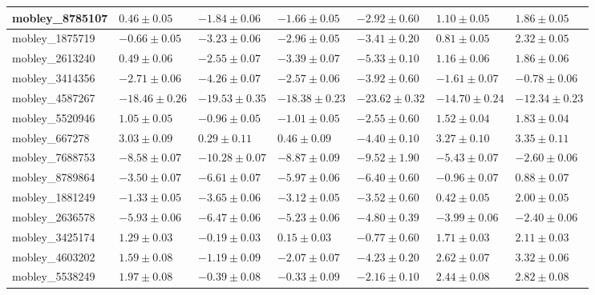 \documentclass{article}
\begin{document}
\begin{landscape}
\begin{longtable}{|l{3.0cm}|l{3.0cm}|l{3.2cm}|l{3.6cm}|l{3.0cm}|l{3.0cm}|l{3.0cm}|}
mobley\_8785107	&	$	0.46	\pm	0.05	$	&	$	-1.84	\pm	0.06	$	&	$	-1.66	\pm	0.05	$	&	$	-2.92	\pm	0.60	$	&	$	1.10	\pm	0.05	$	&	$	1.86	\pm	0.05	$	\\ \hline
mobley\_1875719	&	$	-0.66	\pm	0.05	$	&	$	-3.23	\pm	0.06	$	&	$	-2.96	\pm	0.05	$	&	$	-3.41	\pm	0.20	$	&	$	0.81	\pm	0.05	$	&	$	2.32	\pm	0.05	$	\\ \hline
mobley\_2613240	&	$	0.49	\pm	0.06	$	&	$	-2.55	\pm	0.07	$	&	$	-3.39	\pm	0.07	$	&	$	-5.33	\pm	0.10	$	&	$	1.16	\pm	0.06	$	&	$	1.86	\pm	0.06	$	\\ \hline
mobley\_3414356	&	$	-2.71	\pm	0.06	$	&	$	-4.26	\pm	0.07	$	&	$	-2.57	\pm	0.06	$	&	$	-3.92	\pm	0.60	$	&	$	-1.61	\pm	0.07	$	&	$	-0.78	\pm	0.06	$	\\ \hline
mobley\_4587267	&	$	-18.46	\pm	0.26	$	&	$	-19.53	\pm	0.35	$	&	$	-18.38	\pm	0.23	$	&	$	-23.62	\pm	0.32	$	&	$	-14.70	\pm	0.24	$	&	$	-12.34	\pm	0.23	$	\\ \hline
mobley\_5520946	&	$	1.05	\pm	0.05	$	&	$	-0.96	\pm	0.05	$	&	$	-1.01	\pm	0.05	$	&	$	-2.55	\pm	0.60	$	&	$	1.52	\pm	0.04	$	&	$	1.83	\pm	0.04	$	\\ \hline
mobley\_667278	&	$	3.03	\pm	0.09	$	&	$	0.29	\pm	0.11	$	&	$	0.46	\pm	0.09	$	&	$	-4.40	\pm	0.10	$	&	$	3.27	\pm	0.10	$	&	$	3.35	\pm	0.11	$	\\ \hline
mobley\_7688753	&	$	-8.58	\pm	0.07	$	&	$	-10.28	\pm	0.07	$	&	$	-8.87	\pm	0.09	$	&	$	-9.52	\pm	1.90	$	&	$	-5.43	\pm	0.07	$	&	$	-2.60	\pm	0.06	$	\\ \hline
mobley\_8789864	&	$	-3.50	\pm	0.07	$	&	$	-6.61	\pm	0.07	$	&	$	-5.97	\pm	0.06	$	&	$	-6.40	\pm	0.60	$	&	$	-0.96	\pm	0.07	$	&	$	0.88	\pm	0.07	$	\\ \hline
mobley\_1881249	&	$	-1.33	\pm	0.05	$	&	$	-3.65	\pm	0.06	$	&	$	-3.12	\pm	0.05	$	&	$	-3.52	\pm	0.60	$	&	$	0.42	\pm	0.05	$	&	$	2.00	\pm	0.05	$	\\ \hline
mobley\_2636578	&	$	-5.93	\pm	0.06	$	&	$	-6.47	\pm	0.06	$	&	$	-5.23	\pm	0.06	$	&	$	-4.80	\pm	0.39	$	&	$	-3.99	\pm	0.06	$	&	$	-2.40	\pm	0.06	$	\\ \hline
mobley\_3425174	&	$	1.29	\pm	0.03	$	&	$	-0.19	\pm	0.03	$	&	$	0.15	\pm	0.03	$	&	$	-0.77	\pm	0.60	$	&	$	1.71	\pm	0.03	$	&	$	2.11	\pm	0.03	$	\\ \hline
mobley\_4603202	&	$	1.59	\pm	0.08	$	&	$	-1.19	\pm	0.09	$	&	$	-2.07	\pm	0.07	$	&	$	-4.23	\pm	0.20	$	&	$	2.62	\pm	0.07	$	&	$	3.32	\pm	0.06	$	\\ \hline
mobley\_5538249	&	$	1.97	\pm	0.08	$	&	$	-0.39	\pm	0.08	$	&	$	-0.33	\pm	0.09	$	&	$	-2.16	\pm	0.10	$	&	$	2.44	\pm	0.08	$	&	$	2.82	\pm	0.08	$	\\ \hline

\end{longtable}
\end{landscape}
\end{document}
